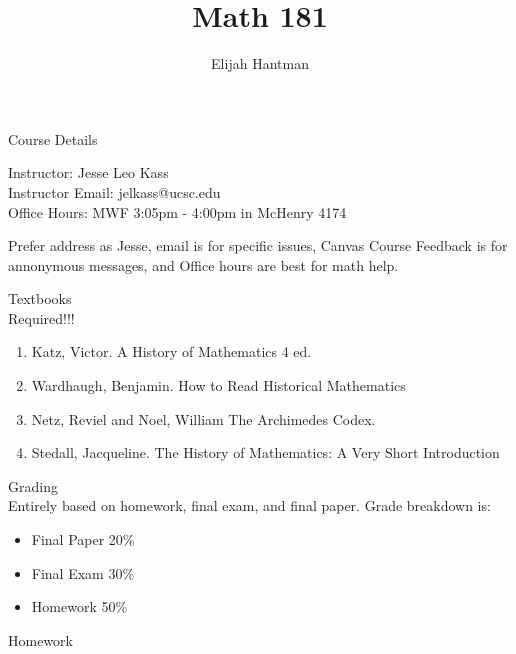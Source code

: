 \documentclass{report}
\title{\Huge{Math 181}}
\author{\huge{Elijah Hantman}}
\date{}
\begin{document}
\maketitle
\newpage

\begin{description}
    \item Course Details 
        \begin{mdframed}
            Instructor: Jesse Leo Kass\\
            Instructor Email: jelkass@ucsc.edu\\
            Office Hours: MWF 3:05pm - 4:00pm in McHenry 4174

            Prefer address as Jesse, email is for specific
            issues, Canvas Course Feedback is for annonymous
            messages, and Office hours are best for math
            help.
        \end{mdframed}
        \begin{mdframed}
            {\large Textbooks}\\
            Required!!!
            \begin{enumerate}
                \item Katz, Victor. A History of Mathematics 4 ed.
                \item Wardhaugh, Benjamin. How to Read Historical
                    Mathematics
                \item Netz, Reviel and Noel, William
                    The Archimedes Codex.
                \item Stedall, Jacqueline. The History of
                    Mathematics: A Very Short Introduction
            \end{enumerate}
        \end{mdframed}
        \begin{mdframed}
            {\large Grading}\\
            Entirely based on homework, final exam, and
            final paper. Grade breakdown is:
            \begin{itemize}
                \item Final Paper 20\%
                \item Final Exam 30\%
                \item Homework 50\%
            \end{itemize}
        \end{mdframed}
        \begin{mdframed}
            {\large Homework}

\end{mdframed}
\end{description}
\end{document}
